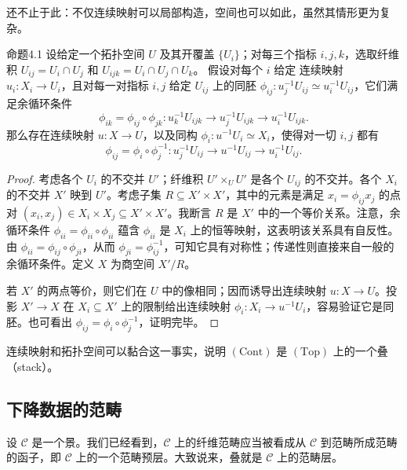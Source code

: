 还不止于此：不仅连续映射可以局部构造，空间也可以如此，虽然其情形更为复杂。

\begin{origstatement}{命题}{4.1}\label{ch04:prop41}
设给定一个拓扑空间 $U$ 及其开覆盖 $\{U_i\}$；对每三个指标 $i,j,k$，选取纤维积 $U_{ij}=U_i\cap U_j$ 和 $U_{ijk}=U_i\cap U_j\cap U_k$。
假设对每个 $i$ 给定
连续映射 $u_i\colon X_i\to U_i$，且对每一对指标 $i,j$ 给定 $U_{ij}$ 上的同胚 $\phi_{ij}\colon u_j^{-1}U_{ij}\simeq u_i^{-1}U_{ij}$，它们满足余循环条件
\[
 \phi_{ik}=\phi_{ij}\circ\phi_{jk}\colon
 u_k^{-1}U_{ijk}\longrightarrow u_j^{-1}U_{ijk}\longrightarrow u_i^{-1}U_{ijk}.
\]
那么存在连续映射 $u\colon X\to U$，以及同构 $\phi_i\colon u^{-1}U_i\simeq X_i$，使得对一切 $i,j$ 都有
\[
 \phi_{ij}=\phi_i\circ\phi_j^{-1}\colon
 u_j^{-1}U_{ij}\longrightarrow u^{-1}U_{ij}\longrightarrow u_i^{-1}U_{ij}.
\]
\end{origstatement}
\begin{proof}
考虑各个 $U_i$ 的不交并 $U'$；纤维积 $U'\times_U U'$ 是各个 $U_{ij}$ 的不交并。各个 $X_i$ 的不交并 $X'$ 映到 $U'$。考虑子集 $R\subseteq X'\times X'$，其中的元素是满足 $x_i=\phi_{ij}x_j$ 的点对 $(x_i,x_j)\in X_i\times X_j\subseteq X'\times X'$。我断言 $R$ 是 $X'$ 中的一个等价关系。注意，余循环条件 $\phi_{ii}=\phi_{ii}\circ\phi_{ii}$ 蕴含 $\phi_{ii}$ 是 $X_i$ 上的恒等映射，这表明该关系具有自反性。由 $\phi_{ii}=\phi_{ij}\circ\phi_{ji}$，从而 $\phi_{ji}=\phi_{ij}^{-1}$，可知它具有对称性；传递性则直接来自一般的余循环条件。定义 $X$ 为商空间 $X'/R$。

若 $X'$ 的两点等价，则它们在 $U$ 中的像相同；因而诱导出连续映射 $u\colon X\to U$。投影 $X'\to X$ 在 $X_i\subseteq X'$ 上的限制给出连续映射 $\phi_i\colon X_i\to u^{-1}U_i$，容易验证它是同胚。也可看出 $\phi_{ij}=\phi_i\circ\phi_j^{-1}$，证明完毕。
\end{proof}

连续映射和拓扑空间可以黏合这一事实，说明 $(\mathrm{Cont})$ 是 $(\mathrm{Top})$ 上的一个叠（stack）。

\subsection{下降数据的范畴}
设 $\mathcal C$ 是一个景。我们已经看到，$\mathcal C$ 上的纤维范畴应当被看成从 $\mathcal C$ 到范畴所成范畴的函子，即 $\mathcal C$ 上的一个范畴预层。大致说来，叠就是 $\mathcal C$ 上的范畴层。

